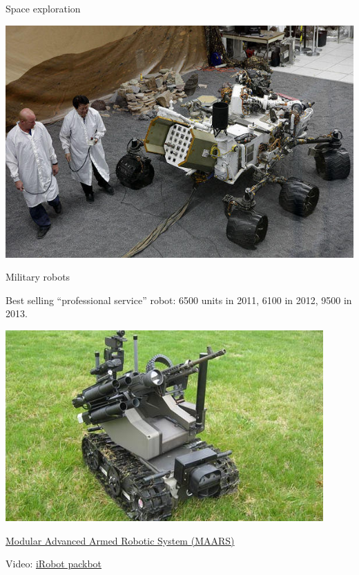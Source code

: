 \documentclass[compress]{beamer}
\begin{document}
\begin{frame}{Space exploration}
\begin{multicols}{2}
\begin{center}
            \includegraphics[width=0.6\linewidth]{space-robot-curiosity}
        \end{center}
    \end{multicols}
\end{frame}

\begin{frame}{Military robots}

Best selling ``professional service'' robot: 6500 units in 2011, 6100 in
2012, 9500 in 2013.

    \begin{center}
        \includegraphics[width=0.6\linewidth]{defence-robot}

        \footnotesize \href{https://en.wikipedia.org/wiki/Modular_Advanced_Armed_Robotic_System}{Modular Advanced Armed Robotic System (MAARS)}
    \end{center}

    Video: \href{http://youtu.be/eaP0waiz43w}{iRobot packbot}

\end{frame}
\end{document}
